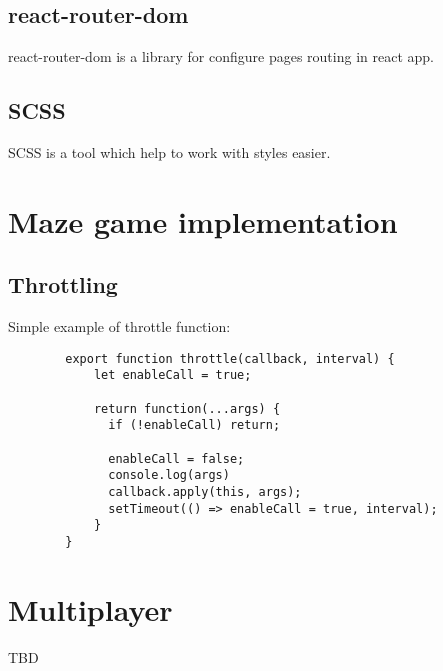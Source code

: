     \subsection{react-router-dom}
    react-router-dom is a library for configure pages routing in react app.
    \subsection{SCSS}
    SCSS is a tool which help to work with styles easier.

\section{Maze game implementation}
    \subsection{Throttling}
    Simple example of throttle function:
    \begin{lstlisting}
        export function throttle(callback, interval) {
            let enableCall = true;
          
            return function(...args) {
              if (!enableCall) return;
          
              enableCall = false;
              console.log(args)
              callback.apply(this, args);
              setTimeout(() => enableCall = true, interval);
            }
        }
		\end{lstlisting}

\section{Multiplayer}
TBD